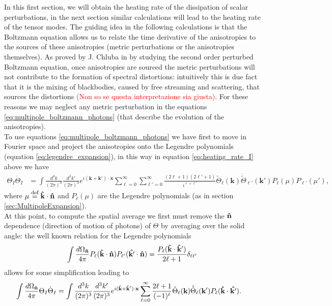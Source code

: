 In this first section, we will obtain the heating rate of the dissipation of scalar perturbations, in the next section similar calculations will lead to the heating rate of the tensor modes. The guiding idea in the following calculations is that the Boltzmann equation allows us to relate the time derivative of the anisotropies to the sources of these anisotropies (metric perturbations or the anisotropies themselves). As proved by J. Chluba in \cite{Chluba_2x2} by studying the second order perturbed Boltzmann equation, once anisotropies are sourced the metric perturbations will not contribute to the formation of spectral distortions: intuitively this is due fact that it is the mixing of blackbodies, caused by free streaming and scattering, that sources the distortions \textcolor{red}{(Non so se questa interpretazione sia giusta)}. For these reasons we may neglect any metric perturbation in the equations \eqref{eq:multipole_boltzmann_photons} (that describe the evolution of the anisotropies).\\ To use equations \eqref{eq:multipole_boltzmann_photons} we have first to move in Fourier space and project the anisotropies onto the Legendre polynomials (equation \eqref{eq:legendre_expansion}), in this way in equation \eqref{eq:heating_rate_I} above we have
\begin{align*}
    \Theta_I\dot \Theta_I&=\int\frac{d^3k}{(2\pi)^3}\frac{d^3k'}{(2\pi)^3}e^{i(\mathbf{k}+\mathbf{k}')\cdot\mathbf{x}}\sum_{\ell=0}^{\infty}\sum_{\ell'=0}^{\infty}\frac{(2\ell+1)(2\ell'+1)}{i^{\ell+\ell'}}\tilde\Theta_\ell(\mathbf{k})\dot{\tilde\Theta}_{\ell'}(\mathbf{k}')P_\ell(\mu)P_{\ell'}(\mu'),
\end{align*}
where $\mu\stackrel{\text{def}}{=}\mathbf{\hat{k}}\cdot\mathbf{\hat{n}}$ and $P_\ell(\mu)$ are the Legendre polynomials (as in section \ref{sec:MultipoleExpansion}). \\
At this point, to compute the spatial average we first must remove the $\mathbf{\hat{n}}$ dependence (direction of motion of photons) of $\Theta$ by averaging over the solid angle: the well known relation for the Legendre polynomials
$$\int\frac{d\Omega_{\mathbf{\hat{n}}}}{4\pi} P_\ell(\mathbf{\hat{k}}\cdot\mathbf{\hat{n}})P_{\ell'}(\mathbf{\hat{k'}}\cdot\mathbf{\hat{n}})=\frac{P_\ell(\mathbf{\hat{k}}\cdot\mathbf{\hat{k}}')}{2\ell+1}\delta_{\ell\ell'}$$
allows for some simplification leading to 
\begin{align*}
    \int\frac{d\Omega_{\mathbf{\hat{n}}}}{4\pi}\Theta_I\dot \Theta_I&=\int\frac{d^3k}{(2\pi)^3}\frac{d^3k'}{(2\pi)^3}e^{i(\mathbf{\hat{k}}+\mathbf{\hat{k}}')\cdot\mathbf{x}}\sum_{\ell=0}^{\infty}\frac{2\ell+1}{(-1)^{\ell}}\tilde\Theta_\ell(\mathbf{k})\dot{\tilde\Theta}_{\ell}(\mathbf{k}')P_\ell(\mathbf{\hat{k}}\cdot\mathbf{\hat{k'}}).
\end{align*}
